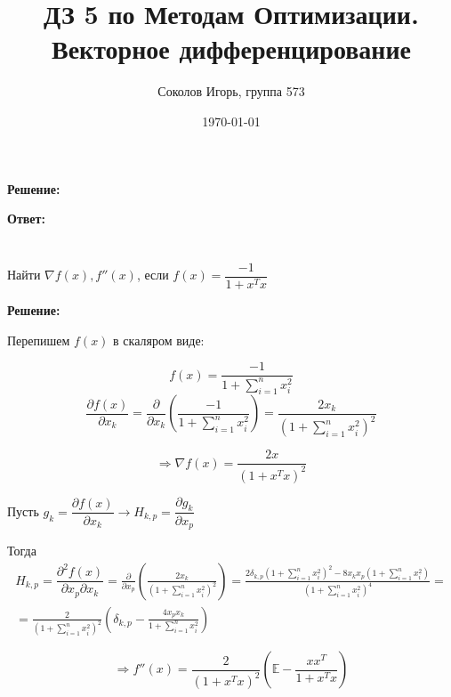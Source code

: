\documentclass[a4paper,12pt]{article}
\author{Соколов Игорь, группа 573}
\title{ДЗ 5 по Методам Оптимизации. \newline Векторное дифференцирование}
\date{\today}
\newcommand{\lt}{\left}
\newcommand{\rt}{\right}
\newcommand{\p}{\partial}
\begin{document}

\maketitle


\section{}


\vspace{\baselineskip}

\textbf{Решение:}

\vspace{\baselineskip}

\textbf{Ответ:} 

\section{}

Найти $\nabla f(x), f''(x)$, если $f(x) = \dfrac{-1}{1 + x^Tx}$

\vspace{\baselineskip}

\textbf{Решение:}

\vspace{\baselineskip}

Перепишем $f(x)$ в скаляром виде:


$$f(x) = \frac{-1}{1 + \sum\limits_{i=1}^n x_i^2} $$
$$\frac{\p f(x)}{\p x_k} = \frac{\p}{\p x_k}\lt(\frac{-1}{1 + \sum\limits_{i=1}^n x_i^2} \rt) = \frac{2x_k}{\lt(1 + \sum\limits_{i=1}^n x_i^2 \rt)^2}$$

$$\Rightarrow \nabla f(x) =  \frac{2{x}}{\lt(1 + {x}^T { x} \rt)^2}$$

Пусть $g_k = \dfrac{\p f(x)}{\p x_k} \rightarrow H_{k,p} = \dfrac{\p g_k}{\p x_p}$

Тогда 
\begin{multline}
H_{k,p} = \dfrac{\p^2 f(x)}{\p x_p \p x_k} = \frac{\p}{\p x_p}\lt(\frac{2x_k}{\lt(1 + \sum\limits_{i=1}^n x_i^2 \rt)^2}\rt) = \frac{2\delta_{k,p}\lt(1 + \sum\limits_{i=1}^n x_i^2 \rt)^2 - 8x_kx_p\lt(1 + \sum\limits_{i=1}^n x_i^2 \rt)}{\lt(1 + \sum\limits_{i=1}^n x_i^2 \rt)^4} =\\= \frac{2}{\lt(1 + \sum\limits_{i=1}^n x_i^2 \rt)^2}\lt(\delta_{k,p} - \frac{4x_p x_k}{1 + \sum\limits_{i=1}^n x_i^2} \rt)
\end{multline}

$$\Rightarrow f''(x) =  \frac{2}{\lt(1 + x^Tx\rt)^2}\lt(\mathbb{E} - \frac{xx^T}{1 + x^Tx} \rt) $$
\end{document}
